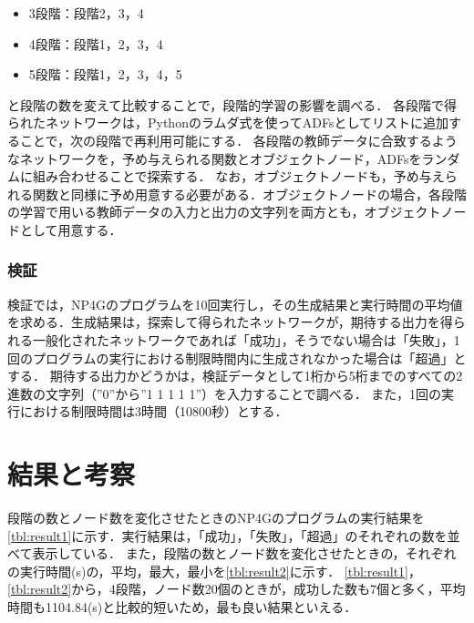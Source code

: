 \documentclass[exploratorypaper]{jsaiart} %
\begin{document}
\begin{itemize}
    \item 3段階：段階2，3，4
    \item 4段階：段階1，2，3，4
    \item 5段階：段階1，2，3，4，5
\end{itemize}
\noindent
と段階の数を変えて比較することで，段階的学習の影響を調べる．
各段階で得られたネットワークは，Pythonのラムダ式を使ってADFsとしてリストに追加することで，次の段階で再利用可能にする．
各段階の教師データに合致するようなネットワークを，予め与えられる関数とオブジェクトノード，ADFsをランダムに組み合わせることで探索する．
なお，オブジェクトノードも，予め与えられる関数と同様に予め用意する必要がある．オブジェクトノードの場合，各段階の学習で用いる教師データの入力と出力の文字列を両方とも，オブジェクトノードとして用意する．

\subsubsection{検証}
検証では，NP4Gのプログラムを10回実行し，その生成結果と実行時間の平均値を求める．生成結果は，探索して得られたネットワークが，期待する出力を得られる一般化されたネットワークであれば「成功」，そうでない場合は「失敗」，1回のプログラムの実行における制限時間内に生成されなかった場合は「超過」とする．
期待する出力かどうかは，検証データとして1桁から5桁までのすべての2進数の文字列（”0”から”1 1 1 1 1”）を入力することで調べる．
また，1回の実行における制限時間は3時間（10800秒）とする．

\section{結果と考察}
段階の数とノード数を変化させたときのNP4Gのプログラムの実行結果を\ref{tbl:result1}に示す．実行結果は，「成功」，「失敗」，「超過」のそれぞれの数を並べて表示している．
また，段階の数とノード数を変化させたときの，それぞれの実行時間(s)の，平均，最大，最小を\ref{tbl:result2}に示す．
\ref{tbl:result1}，\ref{tbl:result2}から，4段階，ノード数20個のときが，成功した数も7個と多く，平均時間も1104.84(s)と比較的短いため，最も良い結果といえる．
\end{document}
